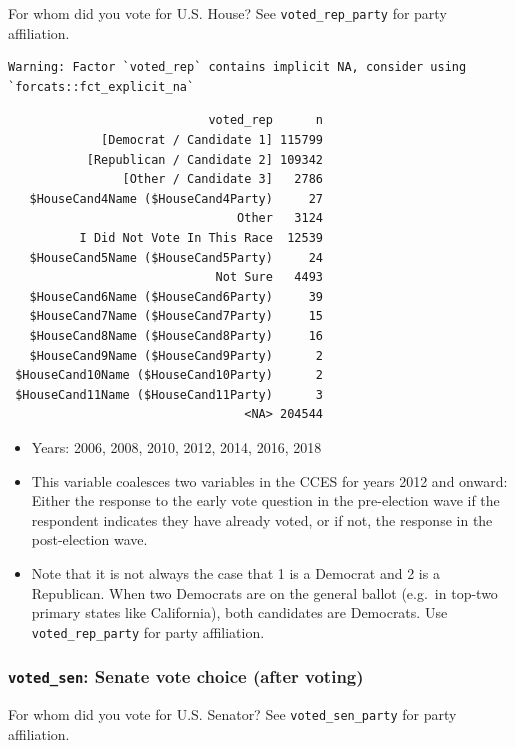 \documentclass[10pt,article,oneside]{memoir}
\theoremstyle{definition}
\begin{document}
For whom did you vote for U.S. House? See \texttt{voted\_rep\_party} for
party affiliation.

\begin{verbatim}
Warning: Factor `voted_rep` contains implicit NA, consider using
`forcats::fct_explicit_na`
\end{verbatim}

\begin{verbatim}
                            voted_rep      n
             [Democrat / Candidate 1] 115799
           [Republican / Candidate 2] 109342
                [Other / Candidate 3]   2786
   $HouseCand4Name ($HouseCand4Party)     27
                                Other   3124
          I Did Not Vote In This Race  12539
   $HouseCand5Name ($HouseCand5Party)     24
                             Not Sure   4493
   $HouseCand6Name ($HouseCand6Party)     39
   $HouseCand7Name ($HouseCand7Party)     15
   $HouseCand8Name ($HouseCand8Party)     16
   $HouseCand9Name ($HouseCand9Party)      2
 $HouseCand10Name ($HouseCand10Party)      2
 $HouseCand11Name ($HouseCand11Party)      3
                                 <NA> 204544
\end{verbatim}

\begin{itemize}
\tightlist
\item
  Years: 2006, 2008, 2010, 2012, 2014, 2016, 2018
\item
  This variable coalesces two variables in the CCES for years 2012 and
  onward: Either the response to the early vote question in the
  pre-election wave if the respondent indicates they have already voted,
  or if not, the response in the post-election wave.
\item
  Note that it is not always the case that 1 is a Democrat and 2 is a
  Republican. When two Democrats are on the general ballot (e.g.~in
  top-two primary states like California), both candidates are
  Democrats. Use \texttt{voted\_rep\_party} for party affiliation.
\end{itemize}

\hypertarget{voted_sen-senate-vote-choice-after-voting}{%
\subsubsection{\texorpdfstring{\texttt{voted\_sen}: Senate vote choice
(after
voting)}{voted\_sen: Senate vote choice (after voting)}}\label{voted_sen-senate-vote-choice-after-voting}}

For whom did you vote for U.S. Senator? See \texttt{voted\_sen\_party}
for party affiliation.
\end{document}
